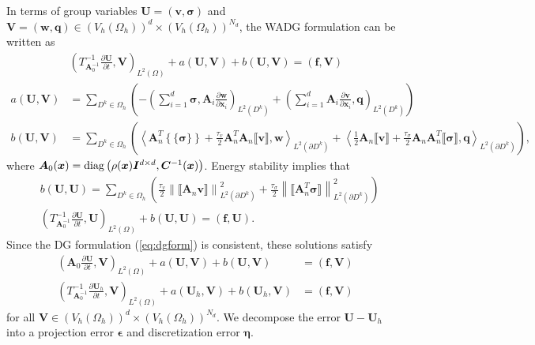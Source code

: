 \documentclass{siamart0216}
\newcommand{\pd}[2]{\frac{\partial#1}{\partial#2}}
\newcommand{\nor}[1]{\left\| #1 \right\|}
\newcommand{\LRp}[1]{\left( #1 \right)}
\newcommand{\LRa}[1]{\left\langle #1 \right\rangle}
\newcommand{\LRc}[1]{\left\{ #1 \right\}}
\newcommand{\jump}[1] {\ensuremath{\llbracket#1\rrbracket}}
\newcommand{\avg}[1] {\ensuremath{\LRc{\!\{#1\}\!}}}
\newcommand{\Oh}{{\Omega_h}}
\renewcommand{\L}{L^2\LRp{\Omega}}
\newcommand{\Lk}{L^2\LRp{D^k}}
\newcommand{\Ldk}{L^2\LRp{\partial D^k}}
\begin{document}
In terms of group variables $\bm{U} = \LRp{\bm{v},\bm{\sigma}}$ and $\bm{V} = \LRp{\bm{w},\bm{q}} \in \LRp{V_h\LRp{\Oh}}^d\times\LRp{V_h\LRp{\Oh}}^{N_d}$, the WADG formulation can be written as
\begin{align*}
&\LRp{T^{-1}_{\bm{A}_0^{-1}}\pd{\bm{U}}{t},\bm{V}}_{\L} + a(\bm{U},\bm{V}) + b(\bm{U},\bm{V}) = (\bm{f},\bm{V})\\
a(\bm{U},\bm{V}) &= \sum_{D^k\in \Oh} \LRp{-\LRp{ \sum_{i=1}^d \bm{\sigma},\bm{A}_i \pd{\bm{w}}{\bm{x}_i}}_{\Lk}  + \LRp{\sum_{i=1}^d \bm{A}_i \pd{\bm{v}}{\bm{x}_i},\bm{q}}_{\Lk}} \\
b(\bm{U},\bm{V}) &= \sum_{D^k\in \Oh}\LRp{ \LRa{\bm{A}_n^T\avg{\bm{\sigma}} + \frac{\tau_v}{2}\bm{A}_n^T\bm{A}_n\jump{\bm{v}},\bm{w}}_{\Ldk} + \LRa{\frac{1}{2}\bm{A}_n\jump{\bm{v}} + \frac{\tau_{\sigma}}{2}\bm{A}_n\bm{A}_n^T\jump{\bm{\sigma}},\bm{q}}_{\Ldk} },
\end{align*}
where $\bm{A}_0(\bm{x}) = {\rm diag}\LRp{\rho(\bm{x})\bm{I}^{d\times d},\bm{C}^{-1}(\bm{x})}$.  Energy stability implies that
\begin{align*}
&b(\bm{U},\bm{U}) = \sum_{D^k\in\Oh} \LRp{\frac{\tau_v}{2}\nor{\jump{\bm{A}_n\bm{v}}}_{\Ldk}^2 + \frac{\tau_\sigma}{2}\nor{\jump{\bm{A}^T_n\bm{\sigma}}}_{\Ldk}^2}\\
&\LRp{T^{-1}_{\bm{A}_0^{-1}}\pd{\bm{U}}{t},\bm{U}}_{\L} + b(\bm{U},\bm{U}) =  (\bm{f},\bm{U}).
\end{align*}
Since the DG formulation (\ref{eq:dgform}) is consistent, these solutions satisfy
\begin{align}
\LRp{\bm{A}_0\pd{\bm{U}}{t},\bm{V}}_{\L} + a(\bm{U},\bm{V}) + b(\bm{U},\bm{V}) &= (\bm{f},\bm{V}) \nonumber\\
\LRp{T_{\bm{A}_0^{-1}}^{-1}\pd{\bm{U}_h}{t},\bm{V}}_{\L} + a(\bm{U}_h,\bm{V}) + b(\bm{U}_h,\bm{V}) &= (\bm{f},\bm{V})
\label{eq:dgvswadg}
\end{align}
for all $\bm{V} \in \LRp{V_h\LRp{\Oh}}^d\times\LRp{V_h\LRp{\Oh}}^{N_d}$.  We decompose the error $\bm{U}-\bm{U}_h$ into a projection error $\bm{\epsilon}$ and discretization error $\bm{\eta}$.
\end{document}
